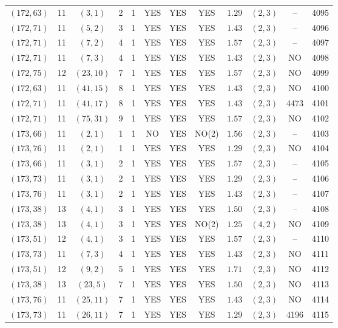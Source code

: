 \begin{longtable}{|c|c|c|c|c|c|c|c|c|c|c|c|}
$(172,63)$ & 11 & $(3,1)$ & 2 & 1 & YES & YES & YES & $1.29$ & $(2,3)$ & -- & 4095\\
$(172,71)$ & 11 & $(5,2)$ & 3 & 1 & YES & YES & YES & $1.43$ & $(2,3)$ & -- & 4096\\
$(172,71)$ & 11 & $(7,2)$ & 4 & 1 & YES & YES & YES & $1.57$ & $(2,3)$ & -- & 4097\\
$(172,71)$ & 11 & $(7,3)$ & 4 & 1 & YES & YES & YES & $1.43$ & $(2,3)$ & NO & 4098\\
$(172,75)$ & 12 & $(23,10)$ & 7 & 1 & YES & YES & YES & $1.57$ & $(2,3)$ & NO & 4099\\
$(172,63)$ & 11 & $(41,15)$ & 8 & 1 & YES & YES & YES & $1.43$ & $(2,3)$ & NO & 4100\\
$(172,71)$ & 11 & $(41,17)$ & 8 & 1 & YES & YES & YES & $1.43$ & $(2,3)$ & 4473 & 4101\\
$(172,71)$ & 11 & $(75,31)$ & 9 & 1 & YES & YES & YES & $1.57$ & $(2,3)$ & NO & 4102\\
$(173,66)$ & 11 & $(2,1)$ & 1 & 1 & NO & YES & NO(2) & $1.56$ & $(2,3)$ & -- & 4103\\
$(173,76)$ & 11 & $(2,1)$ & 1 & 1 & YES & YES & YES & $1.29$ & $(2,3)$ & NO & 4104\\
$(173,66)$ & 11 & $(3,1)$ & 2 & 1 & YES & YES & YES & $1.57$ & $(2,3)$ & -- & 4105\\
$(173,73)$ & 11 & $(3,1)$ & 2 & 1 & YES & YES & YES & $1.29$ & $(2,3)$ & -- & 4106\\
$(173,76)$ & 11 & $(3,1)$ & 2 & 1 & YES & YES & YES & $1.43$ & $(2,3)$ & -- & 4107\\
$(173,38)$ & 13 & $(4,1)$ & 3 & 1 & YES & YES & YES & $1.50$ & $(2,3)$ & -- & 4108\\
$(173,38)$ & 13 & $(4,1)$ & 3 & 1 & YES & YES & NO(2) & $1.25$ & $(4,2)$ & NO & 4109\\
$(173,51)$ & 12 & $(4,1)$ & 3 & 1 & YES & YES & YES & $1.57$ & $(2,3)$ & -- & 4110\\
$(173,73)$ & 11 & $(7,3)$ & 4 & 1 & YES & YES & YES & $1.43$ & $(2,3)$ & NO & 4111\\
$(173,51)$ & 12 & $(9,2)$ & 5 & 1 & YES & YES & YES & $1.71$ & $(2,3)$ & NO & 4112\\
$(173,38)$ & 13 & $(23,5)$ & 7 & 1 & YES & YES & YES & $1.50$ & $(2,3)$ & NO & 4113\\
$(173,76)$ & 11 & $(25,11)$ & 7 & 1 & YES & YES & YES & $1.43$ & $(2,3)$ & NO & 4114\\
$(173,73)$ & 11 & $(26,11)$ & 7 & 1 & YES & YES & YES & $1.29$ & $(2,3)$ & 4196 & 4115\\

\end{longtable}
